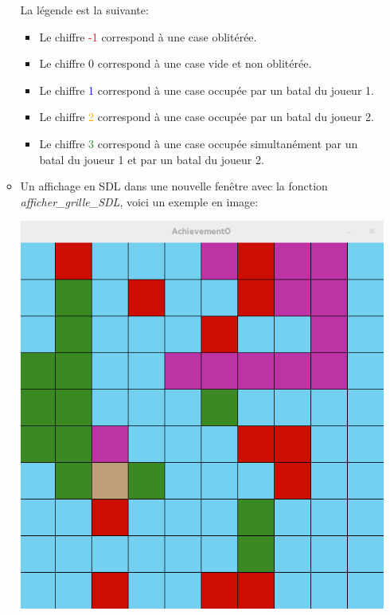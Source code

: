 \begin{itemize}
\begin{itemize}
La légende est la suivante:

\begin{itemize}
\item Le chiffre \textcolor{red}{-1} correspond à une case oblitérée.
\item Le chiffre 0 correspond à une case vide et non oblitérée.
\item Le chiffre \textcolor{blue}{1} correspond à une case occupée par un batal du joueur 1.
\item Le chiffre \textcolor{orange}{2} correspond à une case occupée par un batal du joueur 2.
\item Le chiffre \textcolor{ForestGreen}{3} correspond à une case occupée simultanément par un batal du joueur 1 et par un batal du joueur 2.
\end{itemize}

\item Un affichage en SDL dans une nouvelle fenêtre avec la fonction \textit{afficher\_grille\_SDL}, voici un exemple en image:\\

\begin{center}
\includegraphics[scale=0.6]{image/grille_SDL.png}
\end{center}


\end{itemize}
\end{itemize}
